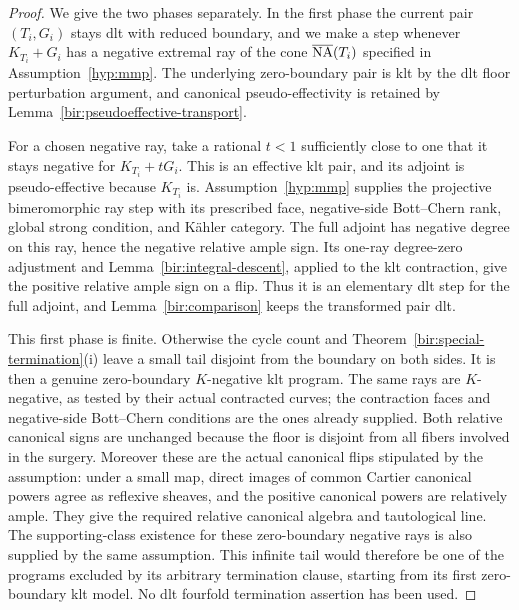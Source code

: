 \begin{proof}
We give the two phases separately.  In the first phase the current
pair $(T_i,G_i)$ stays dlt with reduced boundary, and we make a step
whenever $K_{T_i}+G_i$ has a negative extremal ray of the cone
$\overline{\mathrm{NA}}(T_i)$ specified in Assumption~\ref{hyp:mmp}.
The underlying zero-boundary pair is klt by the dlt floor
perturbation argument, and canonical pseudo-effectivity is retained
by Lemma~\ref{bir:pseudoeffective-transport}.

For a chosen negative ray, take a rational $t<1$ sufficiently close
to one that it stays negative for $K_{T_i}+tG_i$.  This is an
effective klt pair, and its adjoint is pseudo-effective because
$K_{T_i}$ is.  Assumption~\ref{hyp:mmp} supplies the projective
bimeromorphic ray step with its prescribed face, negative-side
Bott--Chern rank, global strong condition, and K\"ahler category.
The full adjoint has negative degree on this ray, hence the negative
relative ample sign.  Its one-ray degree-zero adjustment and
Lemma~\ref{bir:integral-descent}, applied to the klt contraction,
give the positive relative ample sign on a flip.  Thus it is an
elementary dlt step for the full adjoint, and
Lemma~\ref{bir:comparison} keeps the transformed pair dlt.

This first phase is finite.  Otherwise the cycle count and
Theorem~\ref{bir:special-termination}(i) leave a small tail disjoint
from the boundary on both sides.  It is then a genuine
zero-boundary $K$-negative klt program.  The same rays are
$K$-negative, as tested by their actual contracted curves; the
contraction faces and negative-side Bott--Chern conditions are the
ones already supplied.  Both relative canonical signs are unchanged
because the floor is disjoint from all fibers involved in the
surgery.  Moreover these are the actual canonical flips stipulated
by the assumption: under a small map, direct images of common
Cartier canonical powers agree as reflexive sheaves, and the
positive canonical powers are relatively ample.  They give the
required relative canonical algebra and tautological line.  The
supporting-class existence for these zero-boundary negative rays
is also supplied by the same assumption.  This infinite tail would
therefore be one of the programs excluded by its arbitrary
termination clause, starting from its first zero-boundary klt
model.  No dlt fourfold termination assertion has been used.


\end{proof}
